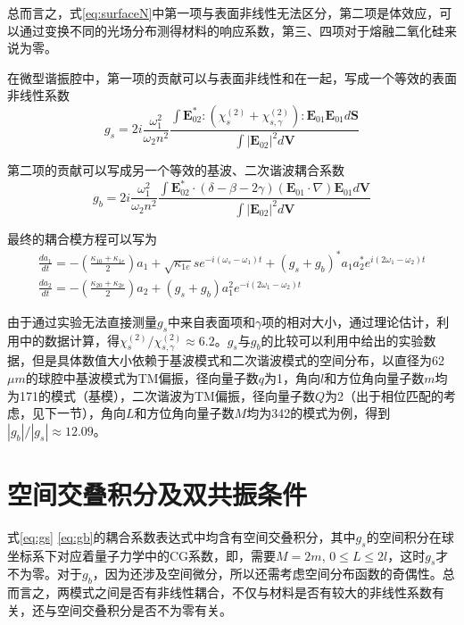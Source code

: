 总而言之，式\ref{eq:surfaceN}中第一项与表面非线性无法区分，第二项是体效应，可以通过变换不同的光场分布测得材料的响应系数，第三、四项对于熔融二氧化硅来说为零。

在微型谐振腔中，第一项的贡献可以与表面非线性和在一起，写成一个等效的表面非线性系数
\begin{equation}
g_s = 2i\frac{\omega_1^2}{\omega_2n^2}\frac{\int \mathbf{E}_{02}^*:(\chi^{(2)}_s+\chi^{(2)}_{s,\gamma}):\mathbf{E}_{01}\mathbf{E}_{01} d\mathbf{S}}{\int |\mathbf{E}_{02}|^2 d\mathbf{V}}
\label{eq:gs}
\end{equation}


第二项的贡献可以写成另一个等效的基波、二次谐波耦合系数
\begin{equation}
g_b =  2i\frac{\omega_1^2}{\omega_2n^2}\frac{\int \mathbf{E}_{02}^* \cdot (\delta-\beta-2\gamma)(\mathbf{E}_{01}\cdot\nabla)\mathbf{E}_{01} d\mathbf{V}}{\int |\mathbf{E}_{02}|^2 d\mathbf{V}}
\label{eq:gb}
\end{equation}

最终的耦合模方程可以写为
\begin{gather}
\label{eq:cpmode}
\frac{da_1}{dt} = -(\frac{\kappa_{10}+\kappa_{1e}}{2})a_1+\sqrt{\kappa_{1e}}se^{-i(\omega_s-\omega_1)t}+(g_s+g_b)^*a_1a_2^*e^{i(2\omega_1-\omega_2)t} \\
\frac{da_2}{dt} = -(\frac{\kappa_{20}+\kappa_{2e}}{2})a_2+(g_s+g_b)a_1^2e^{-i(2\omega_1-\omega_2)t}
\label{eq:cpmode2}
\end{gather}

由于通过实验无法直接测量$g_s$中来自表面项和$\gamma$项的相对大小，通过理论估计，利用\cite{terhune1987second}中的数据计算，得$\chi^{(2)}_s/\chi^{(2)}_{s,\gamma}\approx 6.2$。$g_s$与$g_b$的比较可以利用\cite{rodriguez2008calibration}中给出的实验数据，但是具体数值大小依赖于基波模式和二次谐波模式的空间分布，以直径为62$\mu m$的球腔中基波模式为TM偏振，径向量子数$q$为1，角向$l$和方位角向量子数$m$均为171的模式（基模），二次谐波为TM偏振，径向量子数$Q$为2（出于相位匹配的考虑，见下一节），角向$L$和方位角向量子数$M$均为342的模式为例，得到$|g_b|/|g_s|\approx12.09$。


\section{空间交叠积分及双共振条件}
\label{sec:2Resonance}
式\ref{eq:gs} \ref{eq:gb}的耦合系数表达式中均含有空间交叠积分，其中$g_s$的空间积分在球坐标系下对应着量子力学中的CG系数，即，需要$M=2m$, $0\le L \le 2l$，这时$g_s$才不为零。对于$g_b$，因为还涉及空间微分，所以还需考虑空间分布函数的奇偶性。总而言之，两模式之间是否有非线性耦合，不仅与材料是否有较大的非线性系数有关，还与空间交叠积分是否不为零有关。

